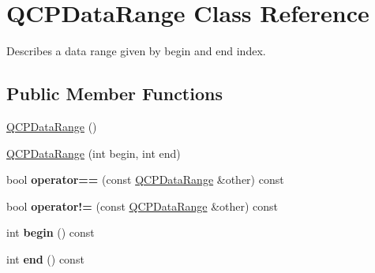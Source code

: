 \hypertarget{class_q_c_p_data_range}{}\section{Q\+C\+P\+Data\+Range Class Reference}
\label{class_q_c_p_data_range}


Describes a data range given by begin and end index.  


\subsection*{Public Member Functions}
\begin{DoxyCompactItemize}
\item 
\hyperlink{class_q_c_p_data_range_a49e72fd9bace1da9d875136dcc04c986}{Q\+C\+P\+Data\+Range} ()
\item 
\hyperlink{class_q_c_p_data_range_a6c7f4a3684210423270515403060e9cf}{Q\+C\+P\+Data\+Range} (int begin, int end)
\item 
bool {\bfseries operator==} (const \hyperlink{class_q_c_p_data_range}{Q\+C\+P\+Data\+Range} \&other) const \hypertarget{class_q_c_p_data_range_a6947b187a6562b98e22e32a5f9663de2}{}\label{class_q_c_p_data_range_a6947b187a6562b98e22e32a5f9663de2}

\item 
bool {\bfseries operator!=} (const \hyperlink{class_q_c_p_data_range}{Q\+C\+P\+Data\+Range} \&other) const \hypertarget{class_q_c_p_data_range_a8eaea2a7c791e7ef494b03af547417a4}{}\label{class_q_c_p_data_range_a8eaea2a7c791e7ef494b03af547417a4}

\item 
int {\bfseries begin} () const \hypertarget{class_q_c_p_data_range_a6b14c93d5010e973427b8ecaebf77864}{}\label{class_q_c_p_data_range_a6b14c93d5010e973427b8ecaebf77864}

\item 
int {\bfseries end} () const \hypertarget{class_q_c_p_data_range_add50cb7075b68a0dd35fb5c962c81bbf}{}\label{class_q_c_p_data_range_add50cb7075b68a0dd35fb5c962c81bbf}


\end{DoxyCompactItemize}
